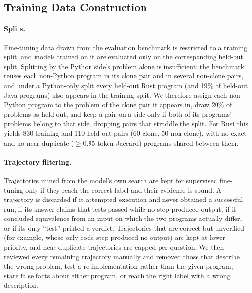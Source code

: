 \subsection{Training Data Construction}
\label{subsec:training_data}

\paragraph{Splits.} Fine-tuning data drawn from the evaluation benchmark is
restricted to a training split, and models trained on it are evaluated only
on the corresponding held-out split. Splitting by the Python side's problem
alone is insufficient: the benchmark reuses each non-Python program in its
clone pair and in several non-clone pairs, and under a Python-only split
every held-out Rust program (and 19\% of held-out Java programs) also appears
in the training split. We therefore assign each non-Python program to the
problem of the clone pair it appears in, draw 20\% of problems as held out,
and keep a pair on a side only if both of its programs' problems belong to
that side, dropping pairs that straddle the split. For Rust this yields 830
training and 110 held-out pairs (60 clone, 50 non-clone), with no exact and
no near-duplicate ($\geq$0.95 token Jaccard) programs shared between them.

\paragraph{Trajectory filtering.} Trajectories mined from the model's own
search are kept for supervised fine-tuning only if they reach the correct
label and their evidence is sound. A trajectory is discarded if it attempted
execution and never obtained a successful run, if its answer claims that
tests passed while no step produced output, if it concluded equivalence from
an input on which the two programs actually differ, or if its only
``test'' printed a verdict. Trajectories that are correct but unverified
(for example, whose only code step produced no output) are kept at lower
priority, and near-duplicate trajectories are capped per question. We then
reviewed every remaining trajectory manually and removed those that describe
the wrong problem, test a re-implementation rather than the given program,
state false facts about either program, or reach the right label with a
wrong description.

